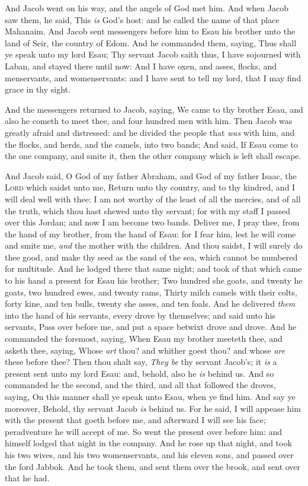\documentclass[11pt,letterpaper,oneside]{memoir}
\begin{document}
And Jacob went on his way, and the angels of God met him. And when Jacob
saw them, he said, This \emph{is} God's host: and he called the name of
that place Mahanaim. And Jacob sent messengers before him to Esau his
brother unto the land of Seir, the country of Edom. And he commanded
them, saying, Thus shall ye speak unto my lord Esau; Thy servant Jacob
saith thus, I have sojourned with Laban, and stayed there until now: And
I have oxen, and asses, flocks, and menservants, and womenservants: and
I have sent to tell my lord, that I may find grace in thy sight.

And the messengers returned to Jacob, saying, We came to thy brother
Esau, and also he cometh to meet thee, and four hundred men with him.
Then Jacob was greatly afraid and distressed: and he divided the people
that \emph{was} with him, and the flocks, and herds, and the camels,
into two bands; And said, If Esau come to the one company, and smite it,
then the other company which is left shall escape.

And Jacob said, O God of my father Abraham, and God of my father Isaac,
the \textsc{Lord} which saidst unto me, Return unto thy country, and to
thy kindred, and I will deal well with thee: I am not worthy of the
least of all the mercies, and of all the truth, which thou hast shewed
unto thy servant; for with my staff I passed over this Jordan; and now I
am become two bands. Deliver me, I pray thee, from the hand of my
brother, from the hand of Esau: for I fear him, lest he will come and
smite me, \emph{and} the mother with the children. And thou saidst, I
will surely do thee good, and make thy seed as the sand of the sea,
which cannot be numbered for multitude. And he lodged there that same
night; and took of that which came to his hand a present for Esau his
brother; Two hundred she goats, and twenty he goats, two hundred ewes,
and twenty rams, Thirty milch camels with their colts, forty kine, and
ten bulls, twenty she asses, and ten foals. And he delivered \emph{them}
into the hand of his servants, every drove by themselves; and said unto
his servants, Pass over before me, and put a space betwixt drove and
drove. And he commanded the foremost, saying, When Esau my brother
meeteth thee, and asketh thee, saying, Whose \emph{art} thou? and
whither goest thou? and whose \emph{are} these before thee? Then thou
shalt say, \emph{They be} thy servant Jacob's; it \emph{is} a present
sent unto my lord Esau: and, behold, also he \emph{is} behind us. And so
commanded he the second, and the third, and all that followed the
droves, saying, On this manner shall ye speak unto Esau, when ye find
him. And say ye moreover, Behold, thy servant Jacob \emph{is} behind us.
For he said, I will appease him with the present that goeth before me,
and afterward I will see his face; peradventure he will accept of me. So
went the present over before him: and himself lodged that night in the
company. And he rose up that night, and took his two wives, and his two
womenservants, and his eleven sons, and passed over the ford Jabbok. And
he took them, and sent them over the brook, and sent over that he had.
\end{document}
